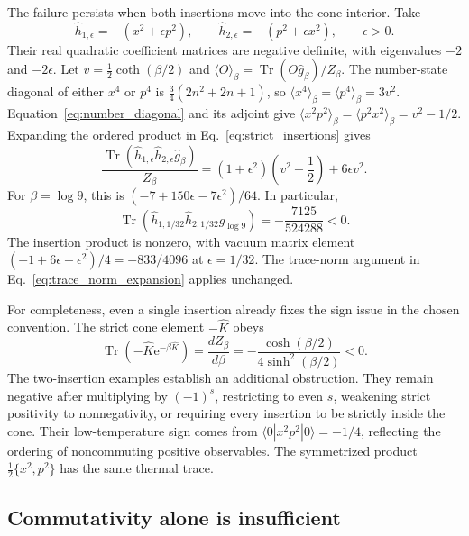 \documentclass[11pt,a4paper]{article}
\newcommand{\Tr}{\operatorname{Tr}}
\newcommand{\ee}{\mathrm e}
\theoremstyle{remark}
\numberwithin{equation}{section}
\begin{document}
The failure persists when both insertions move into the cone interior. Take
\begin{equation}
\hat h_{1,\epsilon}=-(x^2+\epsilon p^2),\qquad
\hat h_{2,\epsilon}=-(p^2+\epsilon x^2),\qquad\epsilon>0.
\label{eq:strict_insertions}
\end{equation}
Their real quadratic coefficient matrices are negative definite, with
eigenvalues \(-2\) and \(-2\epsilon\). Let
\(v=\tfrac12\coth(\beta/2)\) and
\(\langle O\rangle_\beta=\Tr(O\hat g_\beta)/Z_\beta\). The number-state
diagonal of either \(x^4\) or \(p^4\) is
\(\tfrac34(2n^2+2n+1)\), so
\(\langle x^4\rangle_\beta=\langle p^4\rangle_\beta=3v^2\).
Equation~\eqref{eq:number_diagonal} and its adjoint give
\(\langle x^2p^2\rangle_\beta=\langle p^2x^2\rangle_\beta=v^2-1/2\).
Expanding the ordered product in Eq.~\eqref{eq:strict_insertions} gives
\begin{equation}
\frac{\Tr(\hat h_{1,\epsilon}\hat h_{2,\epsilon}\hat g_\beta)}{Z_\beta}
=(1+\epsilon^2)\left(v^2-\frac12\right)+6\epsilon v^2.
\label{eq:strict_inserted_trace}
\end{equation}
For \(\beta=\log9\), this is
\((-7+150\epsilon-7\epsilon^2)/64\). In particular,
\begin{equation}
\boxed{\Tr(\hat h_{1,1/32}\hat h_{2,1/32}\hat g_{\log9})
=-\frac{7125}{524288}<0.}
\label{eq:strict_negative_example}
\end{equation}
The insertion product is nonzero, with vacuum matrix element
\((-1+6\epsilon-\epsilon^2)/4=-833/4096\) at \(\epsilon=1/32\).
The trace-norm argument in Eq.~\eqref{eq:trace_norm_expansion} applies
unchanged.

For completeness, even a single insertion already fixes the sign issue in
the chosen convention. The strict cone element \(-\hat K\) obeys
\begin{equation}
\Tr(-\hat K\ee^{-\beta\hat K})
=\frac{dZ_\beta}{d\beta}
=-\frac{\cosh(\beta/2)}{4\sinh^2(\beta/2)}<0.
\label{eq:single_insertion}
\end{equation}
The two-insertion examples establish an additional obstruction. They remain
negative after multiplying by \((-1)^s\), restricting to even \(s\),
weakening strict positivity to nonnegativity, or requiring every insertion
to be strictly inside the cone. Their low-temperature sign comes from
\(\langle0|x^2p^2|0\rangle=-1/4\), reflecting the ordering of
noncommuting positive observables. The symmetrized product
\(\tfrac12\{x^2,p^2\}\) has the same thermal trace.

\subsection{Commutativity alone is insufficient}
\label{subsec:commuting_counterexample}
\end{document}
